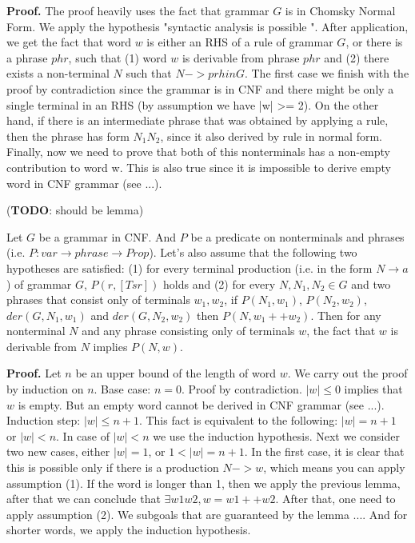 \textbf{Proof.}
The proof heavily uses the fact that grammar $G$ is in Chomsky Normal Form.
We apply the hypothesis "syntactic analysis is possible ". After application, we get the fact that word $w$ is either an RHS of a rule of grammar $G$, or there is a phrase $phr$, such that (1) word $w$ is derivable from phrase $phr$ and (2) there exists a non-terminal $N$ such that $N -> prh in G$.
The first case we finish with the proof by contradiction since the grammar is in CNF and there might be only a single terminal in an RHS (by assumption we have |w| >= 2).
On the other hand, if there is an intermediate phrase that was obtained by applying a rule, then the phrase has form $N_1 N_2$, since it also derived by rule in normal form.
Finally, now we need to prove that both of this nonterminals has a non-empty contribution to word w. This is also true since it is impossible to derive empty word in CNF grammar (see ...).

(\textbf{TODO}: should be lemma)
\begin{theorem}
	Let $G$ be a grammar in CNF. And $P$ be a predicate on nonterminals and phrases (i.e. $P: var \to phrase \to Prop$).
	Let's also assume that the following two hypotheses are satisfied:
	(1) for every terminal production (i.e. in the form $N \to a$) of grammar $G$, $P(r, [Ts r])$ holds and (2) for every $N, N_1, N_2 \in G$ and two phrases that consist only of terminals $w_1, w_2$, if $P(N_1, w_1)$, $P(N_2, w_2)$, $der(G, N_1, w_1)$ and $der(G, N_2, w_2)$ then $P(N, w_1 ++ w_2)$.
	Then for any nonterminal $N$ and any phrase consisting only of terminals $w$, the fact that $w$ is derivable from $N$ implies $P(N,w)$.
\end{theorem}

\textbf{Proof.} 
Let $n$ be an upper bound of the length of word $w$. We carry out the proof by induction on $n$. 
Base case: $ n = 0 $. Proof by contradiction. $|w| \le 0$ implies that $w$ is empty. But an empty word cannot be derived in CNF grammar (see ...).
Induction step: $|w| \le n+1$. This fact is equivalent to the following:  $|w| = n+1$ or $|w| < n$. 
In case of $|w| < n$ we use the induction hypothesis.
Next we consider two new cases, either $|w| = 1 $, or $1 < |w| = n + 1$.
In the first case, it is clear that this is possible only if there is a production $N -> w$, which means you can apply assumption (1).
If the word is longer than 1, then we apply the previous lemma, after that we can conclude that $\exists w1 w2, w = w1 ++ w2$. After that,
one need to apply assumption (2). We subgoals that are guaranteed by the lemma .... And for shorter words, we apply the induction hypothesis.

